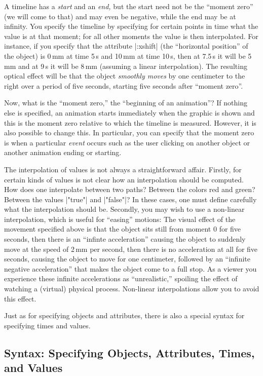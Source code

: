 A timeline has a \emph{start} and an \emph{end,} but the start need
not be the ``moment zero'' (we will come to that) and may even be
negative, while the end may be at infinity. You specify the timeline
by specifying for certain points in time what the value is at that
moment; for all other moments the value is then interpolated. For
instance, if you specify that the attribute |:xshift| (the
``horizontal position'' of the object) is 0\,mm at time 5\,s and 10\,mm
at time 10\,s, then at 7.5\,s it will be 5\,mm and at 9\,s it will
be 8\,mm (assuming a linear interpolation). The resulting optical
effect will be that the object \emph{smoothly moves} by one centimeter
to the right over a period of five seconds, starting five seconds
after ``moment zero''.

Now, what is the ``moment zero,'' the ``beginning of an animation''? If
nothing else is specified, an animation starts immediately when the
graphic is shown and this is the moment zero relative to which the
timeline is measured. However, it is also possible to change this. In
particular, you can specify that the moment zero is when a particular
\emph{event} occurs such as the user clicking on another object or
another animation ending or starting.

The interpolation of values is not always a straightforward affair.
Firstly, for certain kinds of values is not clear how an interpolation
should be computed. How does one interpolate between two paths?
Between the colors red and green? Between the values |"true"| and
|"false"|? In these cases, one must define carefully what the
interpolation should be. Secondly, you may wish to use a non-linear
interpolation, which is useful for ``easing'' motions: The visual
effect of the movement 
specified above is that the object sits still from moment $0$ for five
seconds, then there is an ``infinte acceleration'' causing the object
to suddenly move at the speed of 2\,mm per second, then there is no
acceleration at all for five seconds, causing the object to move for
one centimeter, followed by an ``infinite negative acceleration'' that
makes the object come to a full stop. As a viewer you experience these
infinite accelerations as ``unrealistic,'' spoiling the effect of
watching a (virtual) physical process. Non-linear interpolations allow
you to avoid this effect. 

Just as for specifying objects and attributes, there is also a special
syntax for specifying times and values.


\subsection{Syntax: Specifying Objects, Attributes, Times, and Values}

